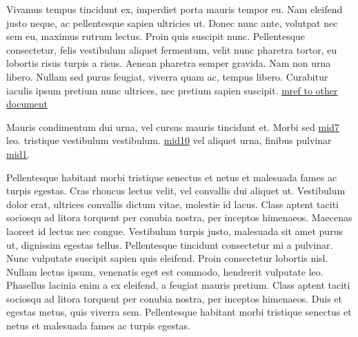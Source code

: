 \documentclass[letterpaper,10pt,english]{sphinxmanual}
\begin{document}
\sphinxAtStartPar
Vivamus tempus tincidunt ex, imperdiet porta mauris tempor eu. Nam eleifend justo neque, ac
pellentesque sapien ultricies ut. Donec nunc ante, volutpat nec sem eu, maximus rutrum lectus. Proin
quis suscipit nunc. Pellentesque consectetur, felis vestibulum aliquet fermentum, velit nunc
pharetra tortor, eu lobortis risus turpis a risus. Aenean pharetra semper gravida. Nam non urna
libero. Nullam sed purus feugiat, viverra quam ac, tempus libero. Curabitur iaculis ipsum pretium
nunc ultrices, nec pretium sapien suscipit. \hyperlink{\detokenize{test_crosspage-mid99-id0}}{\hypertarget{\detokenize{test-mid99-id0}}{mref to other document}}

\sphinxAtStartPar
Mauris condimentum dui urna, vel cursus mauris tincidunt et.
Morbi sed \hyperlink{\detokenize{test-mid7-id1}}{\hypertarget{\detokenize{test-mid7-id0}}{mid7}} leo. \hyperlink{\detokenize{id10}}{}
tristique vestibulum vestibulum. \hyperlink{\detokenize{test-mid10-id1}}{\hypertarget{\detokenize{test-mid10-id0}}{mid10}} vel aliquet urna, finibus pulvinar
\hyperlink{\detokenize{test-mid1-id0}}{\hypertarget{\detokenize{test-mid1-id1}}{mid1}}.

\sphinxAtStartPar
Pellentesque habitant morbi tristique senectus et netus et malesuada fames ac turpis egestas. Cras
rhoncus lectus velit, vel convallis dui aliquet ut. Vestibulum dolor erat, ultrices convallis dictum
vitae, molestie id lacus. Class aptent taciti sociosqu ad litora torquent per conubia nostra, per
inceptos himenaeos. Maecenas laoreet id lectus nec congue. Vestibulum turpis justo, malesuada sit
amet purus ut, dignissim egestas tellus. Pellentesque tincidunt consectetur mi a pulvinar. Nunc
vulputate suscipit sapien quis eleifend. Proin consectetur lobortis nisl. Nullam lectus ipsum,
venenatis eget est commodo, hendrerit vulputate leo. Phasellus lacinia enim a ex eleifend, a feugiat
mauris pretium. Class aptent taciti sociosqu ad litora torquent per conubia nostra, per inceptos
himenaeos. Duis et egestas metus, quis viverra sem. Pellentesque habitant morbi tristique senectus
et netus et malesuada fames ac turpis egestas.
\end{document}
